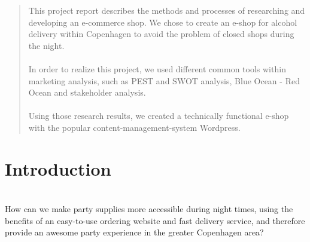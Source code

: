 \documentclass[12p]{article}
\begin{document}

\begin{abstract}
    This project report describes the methods and processes of researching and developing an e-commerce shop. We chose to create an e-shop for alcohol delivery within Copenhagen to avoid the problem of closed shops during the night.
    \\ \\
    In order to realize this project, we used different common tools within marketing analysis, such as PEST and SWOT analysis, Blue Ocean - Red Ocean and stakeholder analysis. 
    \\ \\
    Using those research results, we created a technically functional e-shop with the popular content-management-system Wordpress.
\end{abstract}

\newpage


\tableofcontents %

\newpage %


\section{Introduction}

\begin{center}
\vspace{1em}
\SlimHRule\\[0.1cm]
\Large{How can we make party supplies more accessible during night times, using the benefits of an easy-to-use ordering website and fast delivery service, and therefore provide an awesome party experience in the greater Copenhagen area?}
\SlimHRule\\[0.1cm]
\vspace{1em}
\end{center}
\end{document}
